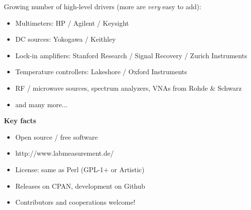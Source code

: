 \documentclass[portrait]{a0poster}
\newcommand{\heading}[1]{
  {\color{heading}\boldmath\textbf{\huge #1}}\\[\medskipamount]
}
\begin{document}
{\begin{minipage}[t][\columnheighta-2\fboxsep-2\fboxrule][t]
\begin{minipage}{\textwidth}
\vspace*{1cm}
Growing number of high-level drivers (more are {\it very} easy to add):
{\large
\begin{itemize}
\item Multimeters: HP / Agilent / Keysight
\item DC sources: Yokogawa / Keithley
\item Lock-in amplifiers: Stanford Research / Signal Recovery / Zurich Instruments
\item Temperature controllers: Lakeshore / Oxford Instruments
\item RF / microwave sources, spectrum analyzers, VNAs from Rohde \& Schwarz 
\item and many more...
\end{itemize}
}
\vspace*{1cm}
\heading{Key facts}
\vspace*{-2cm}
\begin{itemize}
 \item
 Open source / free software\\[-5cm]
 \item 
 http://www.labmeasurement.de/
 \hfill{}
 \item
 License: same as Perl (GPL-1+ or Artistic)
 \item
 Releases on CPAN, development on Github
 \item
 Contributors and cooperations welcome!
\end{itemize}

%
%
%
\end{minipage}
%
\end{minipage}}
%
%
%
%
\end{document}
